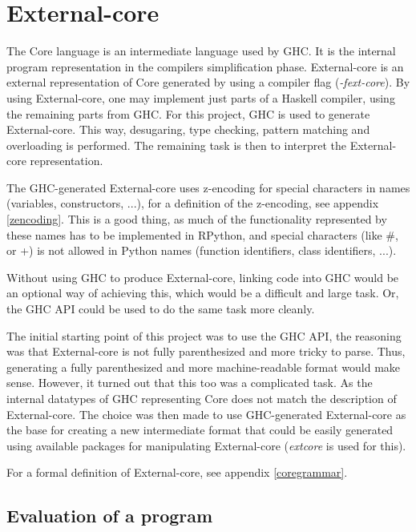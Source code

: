 
\section{External-core}


The Core language is an intermediate language used by GHC. It is the internal
program representation in the compilers simplification phase. External-core
is an external representation of Core generated by using a compiler flag 
(\emph{-fext-core}). By using External-core, one
may implement just parts of a Haskell compiler, using the remaining parts from
GHC. For this project, GHC is used to generate External-core. This way, desugaring,
type checking, pattern matching and overloading is performed. The remaining task
is then to interpret the External-core representation. \cite{tolmach2010ghc}

The GHC-generated External-core uses z-encoding for special characters in names 
(variables, constructors, ...), for
a definition of the z-encoding, see appendix \ref{zencoding}. This is a good thing, as much
of the functionality represented by these names has to be implemented in RPython,
and special characters (like \#{}, or +) is not allowed in Python names (function
identifiers, class identifiers, ...).

Without using GHC to produce External-core, linking code into GHC would be an 
optional way of achieving this, which would be a difficult and large task.
Or, the GHC API could be used to do the same task more cleanly. \cite{tolmach2010ghc}

The initial starting point of this project was to use the GHC API, the reasoning
was that External-core is not fully parenthesized and more tricky to parse. Thus,
generating a fully parenthesized and more machine-readable format would make sense.
However, it turned out that this too was a complicated task. As the internal
datatypes of GHC representing Core does not match the description of External-core. 
The choice was
then made to use GHC-generated External-core as the base for creating a new intermediate
format that could be easily generated using available packages for manipulating
External-core (\emph{extcore} is used for this).

For a formal definition of External-core, see appendix \ref{coregrammar}.

\subsection{Evaluation of a program}

